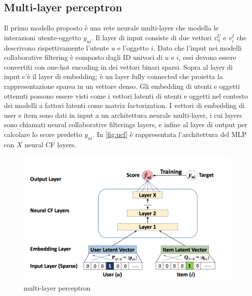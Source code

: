\documentclass[12pt,italian]{report}
\begin{document}
\subsection{Multi-layer perceptron}
Il primo modello proposto è una rete neurale multi-layer che modella le interazioni utente-oggetto $y_{ui}$. Il layer di input consiste di due vettori $v_u^U$ e $v_i^I$ che descrivono rispettivamente l'utente $u$ e l'oggetto $i$. Dato che l'input nei modelli collaborative filtering è composto dagli ID univoci di $u$ e $i$, essi devono essere convertiti con one-hot encoding in dei vettori binari sparsi.
Sopra al layer di input c'è il layer di embedding; è un layer fully connected che proietta la rappresentazione sparsa in un vettore denso.
Gli embedding di utenti e oggetti ottenuti possono essere visti come i vettori latenti di utenti e oggetti nel contesto dei modelli a fattori latenti come matrix factorization.
I vettori di embedding di user e item sono dati in input a un architettura neurale multi-layer, i cui layers sono chiamati neural collaborative filterings layers, e infine al layer di output per calcolare lo score predetto $y_{ui}$. In \autoref{fig:ncf} è rappresentata l'architettura del MLP con $X$ neural CF layers.

\begin{figure}
  \includegraphics[width=\linewidth]{immagini/ncf.png}
  \caption{multi-layer perceptron}
  \label{fig:ncf}
\end{figure}
\end{document}
